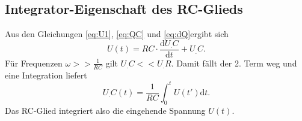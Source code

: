 \subsection{Integrator-Eigenschaft des RC-Glieds}
Aus den Gleichungen \eqref{eq:U1}, \eqref{eq:QC} und \eqref{eq:dQ}ergibt sich
\[
U(t)=RC\cdot\frac{\mathrm{d}U_.C}{\mathrm{d}t} + U_.C\text{.}
\]
Für Frequenzen $\omega >> \frac{1}{RC}$ gilt $U_.C << U_.R$. Damit fällt der 2. Term weg und eine Integration liefert
\[
U_.C(t)=\frac{1}{RC}\int_0^tU(t')\mathrm{d}t\text{.}
\]
Das RC-Glied integriert also die eingehende Spannung $U(t)$.